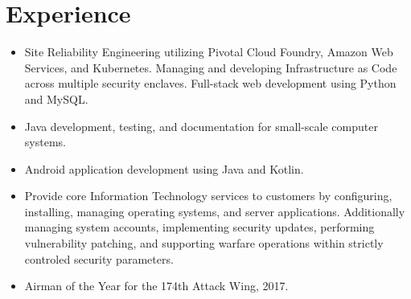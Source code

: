 \documentclass[11pt]{resume}
\author{Seth P. Sevier}
\begin{document}
\maketitle
\smallskip

\section{Experience}
\begin{itemize}
\item Site Reliability Engineering utilizing Pivotal Cloud Foundry, Amazon Web Services, and Kubernetes.  Managing and developing Infrastructure as Code across multiple security enclaves.  Full-stack web development using Python and MySQL.
\item Java development, testing, and documentation for small-scale computer systems.
\item Android application development using Java and Kotlin.
\end{itemize}

\begin{itemize}
\item Provide core Information Technology services to customers by configuring, installing, managing operating systems, and server applications.  Additionally managing system accounts, implementing security updates, performing vulnerability patching, and supporting warfare operations within strictly controled security parameters.
\item Airman of the Year for the 174th Attack Wing, 2017.
\end{itemize}
\end{document}
